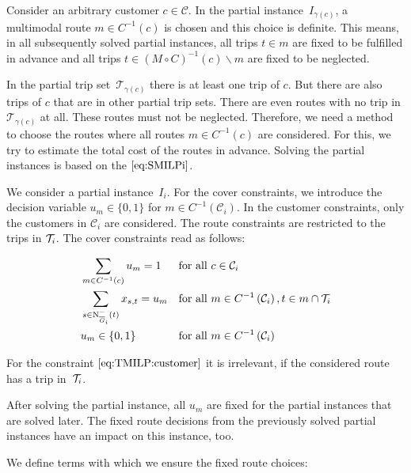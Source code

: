 Consider an arbitrary customer $c\in\mathcal{C}$. In the partial instance~$I_{\gamma(c)}$, a multimodal route $m\in C^{-1}(c)$ is chosen and this choice is definite. This means, in all subsequently solved partial instances, all trips ${t\in m}$ are fixed to be fulfilled in advance and all trips ${t\in(M\circ C)^{-1}(c)\backslash m}$ are fixed to be neglected.

In the partial trip set~$\mathcal{T}_{\gamma(c)}$ there is at least one trip of $c$. But there are also trips of $c$ that are in other partial trip sets. There are even routes with no trip in $\mathcal{T}_{\gamma(c)}$ at all. These routes must not be neglected. Therefore, we need a method to choose the routes where all routes ${m\in C^{-1}(c)}$ are considered. For this, we try to estimate the total cost of the routes in advance. Solving the partial instances is based on the $\eqref{eq:SMILPi}$.

We consider a partial instance~$I_i$. For the cover constraints, we introduce the decision variable ${u_m\in\{0,1\}}$ for ${m\in C^{-1}\left(\mathcal{C}_i\right)}$. In the customer constraints, only the customers in $\mathcal{C}_i$ are considered. The route constraints are restricted to the trips in $\mathcal{T}_i$. The cover constraints read as follows:

\begin{align}
	& \sum_{m\in C^{-1}(c)} u_m = 1 && \text{for all } c\in\mathcal{C}_i \label{eq:TMILP:customer} \\
	& \sum_{s\in\operatorname{N}_{\overline{G}_i}^-(t)} x_{s,t} = u_m && \text{for all } m\in C^{-1}\left(\mathcal{C}_i\right), t\in m\cap\mathcal{T}_i \label{eq:TMILP:route} \\
	& u_m\in\{0,1\} && \text{for all } m\in C^{-1}\left(\mathcal{C}_i\right) \label{eq:TMILP:um}
\end{align}

For the constraint $\eqref{eq:TMILP:customer}$ it is irrelevant, if the considered route has a trip in~$\mathcal{T}_i$.

After solving the partial instance, all $u_m$ are fixed for the partial instances that are solved later. The fixed route decisions from the previously solved partial instances have an impact on this instance, too. 

We define terms with which we ensure the fixed route choices:

